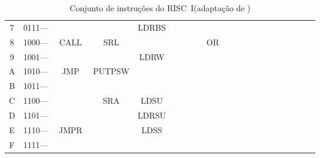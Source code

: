 \documentclass[
	article,			%
	11pt,				%
	oneside,			%
	a4paper,			%
	english,			%
	brazil,				%
	sumario=tradicional
	]{abntex2}
\begin{document}
\begin{table}[!htp]
\begin{tabular}{ccccccccccc}
7 &\cellcolor[HTML]{d9ead3}0111--- &\cellcolor[HTML]{b4a7d6} &\cellcolor[HTML]{93c47d} &\cellcolor[HTML]{e69138}LDRBS &\cellcolor[HTML]{a64d79} &\cellcolor[HTML]{a4c2f4} &\cellcolor[HTML]{45818e} &\cellcolor[HTML]{20124d} &\cellcolor[HTML]{a61c00} \\
8 &1000--- &\cellcolor[HTML]{8e7cc3}CALL &\cellcolor[HTML]{6fa8dc}SRL &\cellcolor[HTML]{b45f06}\textcolor{white}{LDW} &\cellcolor[HTML]{741b47}\textcolor{white}{STW} &\cellcolor[HTML]{6d9eeb}OR &\cellcolor[HTML]{134f5c}\textcolor{white}{ADD} &\cellcolor[HTML]{cc4125}\textcolor{white}{GETLPC} &\cellcolor[HTML]{a61c00} \\
9 &\cellcolor[HTML]{d9ead3}1001--- &\cellcolor[HTML]{8e7cc3} &\cellcolor[HTML]{6fa8dc} &\cellcolor[HTML]{fff2cc}LDRW &\cellcolor[HTML]{4c1130}\textcolor{white}{STRW} &\cellcolor[HTML]{6d9eeb} &\cellcolor[HTML]{134f5c} &\cellcolor[HTML]{cc4125} &\cellcolor[HTML]{a61c00} \\
A &1010--- &\cellcolor[HTML]{e6b8af}JMP &\cellcolor[HTML]{6aa84f}PUTPSW &\cellcolor[HTML]{b45f06} &\cellcolor[HTML]{741b47} &\cellcolor[HTML]{6d9eeb} &\cellcolor[HTML]{134f5c} &\cellcolor[HTML]{cc4125} &\cellcolor[HTML]{a61c00} \\
B &\cellcolor[HTML]{d9ead3}1011--- &\cellcolor[HTML]{e6b8af} &\cellcolor[HTML]{6aa84f} &\cellcolor[HTML]{fff2cc} &\cellcolor[HTML]{4c1130} &\cellcolor[HTML]{6d9eeb} &\cellcolor[HTML]{134f5c} &\cellcolor[HTML]{cc4125} &\cellcolor[HTML]{a61c00} \\
C &1100--- &\cellcolor[HTML]{674ea7}\textcolor{white}{CALLR} &\cellcolor[HTML]{3d85c6}SRA &\cellcolor[HTML]{ffe599}LDSU &\cellcolor[HTML]{741b47} &\cellcolor[HTML]{6d9eeb} &\cellcolor[HTML]{0c343d}\textcolor{white}{ADDC} &\cellcolor[HTML]{cc4125} &\cellcolor[HTML]{a61c00} \\
D &\cellcolor[HTML]{d9ead3}1101--- &\cellcolor[HTML]{674ea7} &\cellcolor[HTML]{3d85c6} &\cellcolor[HTML]{ffd966}LDRSU &\cellcolor[HTML]{4c1130} &\cellcolor[HTML]{6d9eeb} &\cellcolor[HTML]{0c343d} &\cellcolor[HTML]{cc4125} &\cellcolor[HTML]{a61c00} \\
E &1110--- &\cellcolor[HTML]{dd7e6b}JMPR &\cellcolor[HTML]{3d85c6} &\cellcolor[HTML]{f1c232}LDSS &\cellcolor[HTML]{741b47} &\cellcolor[HTML]{6d9eeb} &\cellcolor[HTML]{0c343d} &\cellcolor[HTML]{cc4125} &\cellcolor[HTML]{a61c00} \\
F &\cellcolor[HTML]{d9ead3}1111--- &\cellcolor[HTML]{dd7e6b} &\cellcolor[HTML]{3d85c6} &\cellcolor[HTML]{bf9000}\textcolor{white}{LDRSS} &\cellcolor[HTML]{4c1130} &\cellcolor[HTML]{6d9eeb} &\cellcolor[HTML]{0c343d} &\cellcolor[HTML]{cc4125} &\cellcolor[HTML]{a61c00} \\
\bottomrule
\end{tabular}
\caption{Conjunto de instruções do RISC~I(adaptação de )}\label{tab:instructionSet}
\end{table}
\end{document}
